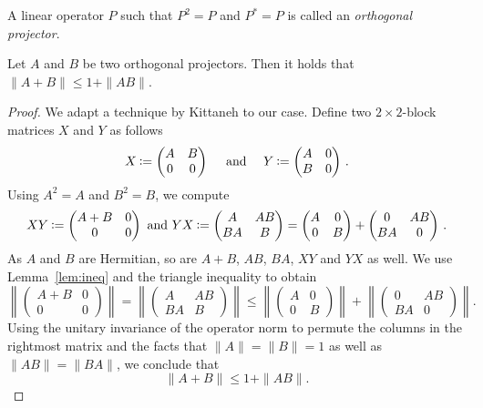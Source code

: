 A linear operator $P$ such that $P^2=P$ and $P^*=P$ is called an
\emph{orthogonal projector}.
\begin{proposition} \label{prop:norm2}
Let $A$ and $B$ be two orthogonal projectors. Then it holds that $\|A+B\| \leq 1 + \|AB\|$.
\end{proposition}
\begin{proof}
We adapt a technique by Kittaneh \cite{Kittaneh97} to
our case. Define two $2 \times 2$-block matrices $X$ and $Y$ as follows
\[
X \assign \begin{pmatrix} A & B \\ 0 & 0 \end{pmatrix}
\quad \mbox{ and } \quad
Y \assign \begin{pmatrix} A & 0 \\ B & 0 \end{pmatrix} \, .
\]
Using $A^2=A$ and $B^2=B$, we compute
\[
XY \assign \begin{pmatrix} A+B & 0 \\ 0 & 0 \end{pmatrix}
\mbox{ and }
YX \assign \begin{pmatrix} A & AB \\ BA & B \end{pmatrix}
= \begin{pmatrix}  A & 0 \\ 0 & B \end{pmatrix}
+
\begin{pmatrix} 0 & AB \\ BA & 0 \end{pmatrix} \, .
\]
As $A$ and $B$ are Hermitian, so are $A+B$, $AB$, $BA$, $XY$ and $YX$ as well.
We use Lemma~\ref{lem:ineq} and the triangle inequality to obtain
\[
\left\| \begin{pmatrix} A+B & 0 \\ 0 & 0 \end{pmatrix} \right\| 
= \left\| \begin{pmatrix} A & AB \\ BA & B \end{pmatrix} \right\| 
\leq \left\| \begin{pmatrix} A & 0 \\ 0 & B \end{pmatrix}  \right\| 
  + \left\| \begin{pmatrix} 0 & AB \\ BA & 0 \end{pmatrix} \right\|.
\]
Using the unitary invariance of the operator norm to permute the
columns in the rightmost matrix and the facts that $\|A\|=\|B\|=1$ as
well as $\|AB\|=\|BA\|$, we conclude that
\[
\| A+B \| \leq 1 + \|AB\|.
\]
\end{proof}

